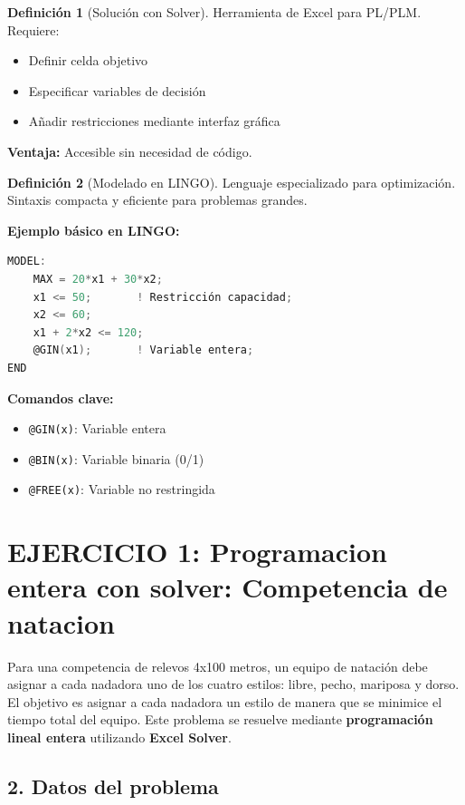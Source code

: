\documentclass[12pt, a4paper, oneside]{book}
\theoremstyle{definition}
\newtheorem{definicion}{Definición}[chapter]
\begin{document}
\begin{definicion}[Solución con Solver]
Herramienta de Excel para PL/PLM. Requiere:
\begin{itemize}[leftmargin=*]
\item Definir celda objetivo
\item Especificar variables de decisión
\item Añadir restricciones mediante interfaz gráfica
\end{itemize}

\textbf{Ventaja:} Accesible sin necesidad de código.
\end{definicion}

\begin{definicion}[Modelado en LINGO]
Lenguaje especializado para optimización. Sintaxis compacta y eficiente para problemas grandes.

\textbf{Ejemplo básico en LINGO:}
\begin{lstlisting}[language=C]
MODEL:
    MAX = 20*x1 + 30*x2;
    x1 <= 50;       ! Restricción capacidad;
    x2 <= 60;
    x1 + 2*x2 <= 120;
    @GIN(x1);       ! Variable entera;
END
\end{lstlisting}

\textbf{Comandos clave:}
\begin{itemize}[leftmargin=*]
\item \texttt{@GIN(x)}: Variable entera
\item \texttt{@BIN(x)}: Variable binaria (0/1)
\item \texttt{@FREE(x)}: Variable no restringida
\end{itemize}
\end{definicion}

\section{EJERCICIO 1: Programacion entera con solver: Competencia de natacion}

Para una competencia de relevos 4x100 metros, un equipo de natación debe asignar a cada nadadora uno de los cuatro estilos: libre, pecho, mariposa y dorso. El objetivo es asignar a cada nadadora un estilo de manera que se minimice el tiempo total del equipo. Este problema se resuelve mediante \textbf{programación lineal entera} utilizando \textbf{Excel Solver}.

\subsection{2. Datos del problema}
\end{document}
